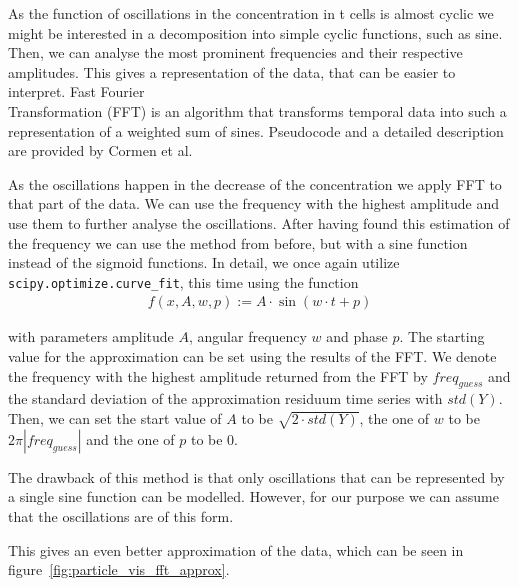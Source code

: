 As the function of oscillations in the \Calcium concentration in t cells is almost cyclic we might be interested in a decomposition into simple cyclic functions, such as sine. Then, we can analyse the most prominent frequencies and their respective amplitudes. This gives a representation of the data, that can be easier to interpret. Fast Fourier\\ Transformation (FFT) is an algorithm that transforms temporal data into such a\\ representation of a weighted sum of sines. Pseudocode and a detailed description are provided by Cormen et al\cite{Cormen2009}.

As the oscillations happen in the decrease of the \Calcium concentration we apply FFT to that part of the data. We can use the frequency with the highest amplitude and use them to further analyse the oscillations. After having found this estimation of the frequency we can use the method from before, but with a sine function instead of the sigmoid functions. In detail, we once again utilize \texttt{scipy.optimize.curve\_fit}, this time using the function
\begin{align*}
	f(x, A, w, p) := A \cdot \sin(w \cdot t + p)
\end{align*}

with parameters amplitude $A$, angular frequency $w$ and phase $p$. The starting value for the approximation can be set using the results of the FFT. We denote the frequency with the highest amplitude returned from the FFT by $freq_{guess}$ and the standard deviation of the approximation residuum time series with $std(Y)$. Then, we can set the start value of $A$ to be $\sqrt{2 \cdot std(Y)}$, the one of $w$ to be $2\pi |freq_{guess}|$ and the one of $p$ to be $0$.

The drawback of this method is that only oscillations that can be represented by a single sine function can be modelled. However, for our purpose we can assume that the oscillations are of this form.

This gives an even better approximation of the data, which can be seen in figure~\ref{fig:particle_vis_fft_approx}.

